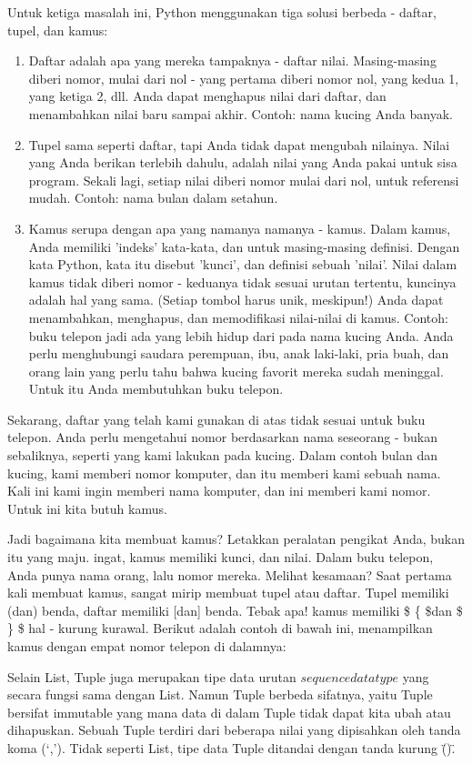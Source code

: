 Untuk ketiga masalah ini, Python menggunakan tiga solusi berbeda - daftar, tupel, dan kamus: 
\begin{enumerate}
\item Daftar adalah apa yang mereka tampaknya - daftar nilai. Masing-masing diberi nomor, mulai dari nol - yang pertama diberi nomor nol, yang kedua 1, yang ketiga 2, dll. Anda dapat menghapus nilai dari daftar, dan menambahkan nilai baru sampai akhir. Contoh: nama kucing Anda banyak. 
\item Tupel sama seperti daftar, tapi Anda tidak dapat mengubah nilainya. Nilai yang Anda berikan terlebih dahulu, adalah nilai yang Anda pakai untuk sisa program. Sekali lagi, setiap nilai diberi nomor mulai dari nol, untuk referensi mudah. Contoh: nama bulan dalam setahun. 
\item Kamus serupa dengan apa yang namanya namanya - kamus. Dalam kamus, Anda memiliki 'indeks' kata-kata, dan untuk masing-masing definisi. Dengan kata Python, kata itu disebut 'kunci', dan definisi sebuah 'nilai'. Nilai dalam kamus tidak diberi nomor - keduanya tidak sesuai urutan tertentu, kuncinya adalah hal yang sama. (Setiap tombol harus unik, meskipun!) Anda dapat menambahkan, menghapus, dan memodifikasi nilai-nilai di kamus. Contoh: buku telepon jadi ada yang lebih hidup dari pada nama kucing Anda. Anda perlu menghubungi saudara perempuan, ibu, anak laki-laki, pria buah, dan orang lain yang perlu tahu bahwa kucing favorit mereka sudah meninggal. Untuk itu Anda membutuhkan buku telepon. 
\end{enumerate}
Sekarang, daftar yang telah kami gunakan di atas tidak sesuai untuk buku telepon. Anda perlu mengetahui nomor berdasarkan nama seseorang - bukan sebaliknya, seperti yang kami lakukan pada kucing. Dalam contoh bulan dan kucing, kami memberi nomor komputer, dan itu memberi kami sebuah nama. Kali ini kami ingin memberi nama komputer, dan ini memberi kami nomor. Untuk ini kita butuh kamus.

Jadi bagaimana kita membuat kamus? Letakkan peralatan pengikat Anda, bukan itu yang maju. ingat, kamus memiliki kunci, dan nilai. Dalam buku telepon, Anda punya nama orang, lalu nomor mereka. Melihat kesamaan? Saat pertama kali membuat kamus, sangat mirip membuat tupel atau daftar. Tupel memiliki (dan) benda, daftar memiliki [dan] benda. Tebak apa! kamus memiliki \$  \{  \$dan \$  \}  \$ hal - kurung kurawal. Berikut adalah contoh di bawah ini, menampilkan kamus dengan empat nomor telepon di dalamnya: 

Selain List, Tuple juga merupakan tipe data urutan \(sequence data type\) yang secara fungsi sama dengan List. Namun Tuple berbeda sifatnya, yaitu Tuple bersifat immutable yang mana data di dalam Tuple tidak dapat kita ubah atau dihapuskan. Sebuah Tuple terdiri dari beberapa nilai yang dipisahkan oleh tanda koma (‘,’). Tidak seperti List, tipe data Tuple ditandai dengan tanda kurung \"()\".

